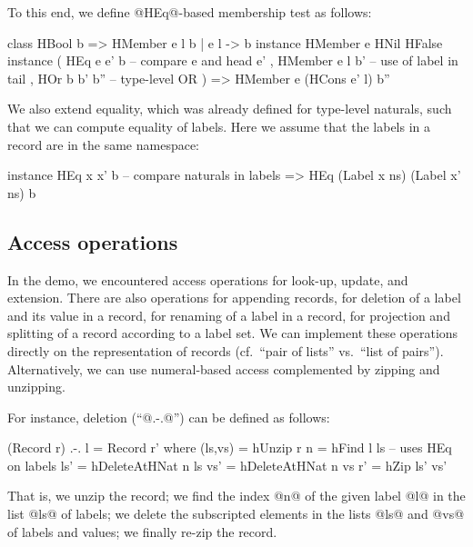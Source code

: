 \documentclass[nocopyrightspace,preprint]{sigplan-proc}
\begin{document}
To this end, we define @HEq@-based membership test as follows:

\begin{code}
 class HBool b => HMember e l b | e l -> b
 instance HMember e HNil HFalse
 instance ( HEq e e' b     -- compare e and head e'
          , HMember e l b' -- use of label in tail 
          , HOr b b' b''   -- type-level OR
          ) =>  HMember e (HCons e' l) b''
\end{code}

We also extend equality, which was already defined for type-level
naturals, such that we can compute equality of labels. Here we assume
that the labels in a record are in the same namespace:

\begin{code}
 instance HEq x x' b -- compare naturals in labels
       => HEq (Label x ns) (Label x' ns) b
\end{code}


\medskip

\subsection*{Access operations}

In the demo, we encountered access operations for look-up, update, and
extension. There are also operations for appending records, for
deletion of a label and its value in a record, for renaming of a label
in a record, for projection and splitting of a record according to a
label set. We can implement these operations directly on the
representation of records (cf.\ ``pair of lists'' vs.\ ``list of
pairs''). Alternatively, we can use numeral-based access complemented
by zipping and unzipping.

For instance, deletion (``@.-.@'') can be defined as follows:

\begin{code}
 (Record r) .-. l = Record r'
    where (ls,vs) = hUnzip r
          n       = hFind l ls -- uses HEq on labels
          ls'     = hDeleteAtHNat n ls
          vs'     = hDeleteAtHNat n vs
          r'      = hZip ls' vs'
\end{code}

That is, we unzip the record; we find the index @n@ of the given label
@l@ in the list @ls@ of labels; we delete the subscripted elements in
the lists @ls@ and @vs@ of labels and values; we finally re-zip the
record.



\end{document}

